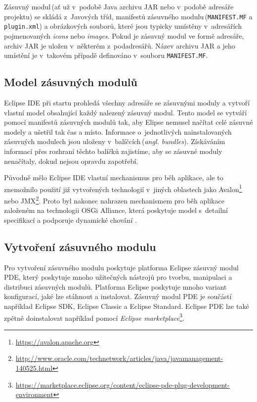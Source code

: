   Zásuvný modul\,(ať už v~podobě Java archivu JAR nebo v~podobě adresáře projektu) se skládá z~Javových tříd, manifestů zásuvného modulu\,(\texttt{MANIFEST.MF} a \texttt{plugin.xml}) a obrázkových souborů, které jsou typicky umístěny v~adresářích pojmenovaných \emph{icons} nebo \emph{images}. Pokud je zásuvný modul ve formě adresáře, archiv JAR je uložen v~některém z~podadresářů. Název archivu JAR a jeho umístění je v~takovém případě definováno v~souboru \texttt{MANIFEST.MF}.

    \subsection{Model zásuvných modulů}
    Eclipse IDE při startu prohledá všechny adresáře se zásuvnými moduly a vytvoří vlastní model obsahující každý nalezený zásuvný modul. Tento model se vytváří pomocí manifestů zásuvných modulů tak, aby Elipse nemusel načítat celé zásuvné modely a ušetřil tak čas a místo. Informace o~jednotlivých nainstalovaných zásuvných modulech jsou uloženy v~balíčcích\,(\emph{angl. bundles}). Získáváním informací přes rozhraní těchto balíčků zajistíme, aby se zásuvné moduly nenačítaly, dokud nejsou opravdu zapotřebí.

    Původně mělo Eclipse IDE vlastní mechanismus pro běh aplikace, ale to znemožnilo použití již vytvořených technologií v~jiných oblastech jako Avalon\footnote{\url{https://avalon.apache.org}} nebo JMX\footnote{\url{http://www.oracle.com/technetwork/articles/java/javamanagement-140525.html}}. Proto byl nakonec nahrazen mechanismem pro běh aplikace založeném na technologii OSGi Alliance, která poskytuje model s~detailní specifikací a podporuje dynamické chování \cite{Plugins}.

    \subsection{Vytvoření zásuvného modulu}
    Pro vytvoření zásuvného modulu poskytuje platforma Eclipse zásuvný modul PDE, který poskytuje mnoho užitečných nástrojů pro tvorbu, manipulaci a distribuci zásuvných modulů. Platforma Eclipse poskytuje mnoho variant konfigurací, jaké lze stáhnout a instalovat. Zásuvný modul PDE je součástí například Eclipse SDK, Eclipse Classic a Eclipse Standard. Eclipse PDE lze také zpětně doinstalovat například pomocí \emph{Eclipse marketplace}\footnote{\url{https://marketplace.eclipse.org/content/eclipse-pde-plug-development-environment}}.

